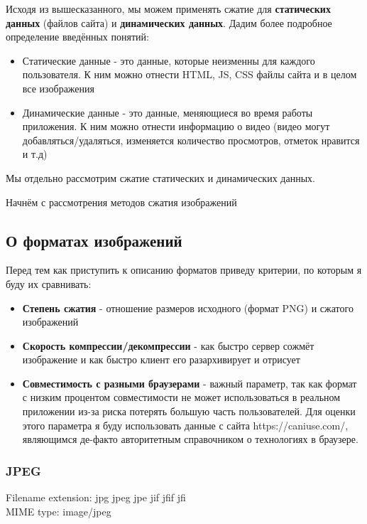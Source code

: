 \documentclass[12pt]{article}
\begin{document}
Исходя из вышесказанного, мы можем применять сжатие для \textbf{статических данных} (файлов сайта)
и \textbf{динамических данных}. Дадим более подробное определение введённых понятий:

\begin{itemize}
    \item Статические данные - это данные, которые неизменны для каждого пользователя. К ним можно отнести HTML, JS, CSS файлы сайта и в целом все изображения
    \item Динамические данные - это данные, меняющиеся во время работы приложения.
          К ним можно отнести информацию о видео (видео могут добавляться/удаляться, изменяется количество просмотров, отметок нравится и т.д)
\end{itemize}

Мы отдельно рассмотрим сжатие статических и динамических данных.

Начнём с рассмотрения методов сжатия изображений

\subsection{О форматах изображений}

Перед тем как приступить к описанию форматов приведу критерии, по которым я буду их сравнивать:

\begin{itemize}
    \item \textbf{Степень сжатия} - отношение размеров исходного (формат PNG) и сжатого изображений
    \item \textbf{Скорость компрессии/декомпрессии} - как быстро сервер сожмёт изображение и как быстро клиент его разархивирует и отрисует
    \item \textbf{Совместимость с разными браузерами} - важный параметр,
          так как формат с низким процентом совместимости не может использоваться в реальном приложении
          из-за риска потерять большую часть пользователей. Для оценки этого параметра
          я буду использовать данные с сайта https://caniuse.com/, являющимся де-факто авторитетным справочником
          о технологиях в браузере.
\end{itemize}

\subsubsection{JPEG}

Filename extension: jpg jpeg jpe jif jfif jfi \\
MIME type: image/jpeg
\end{document}
